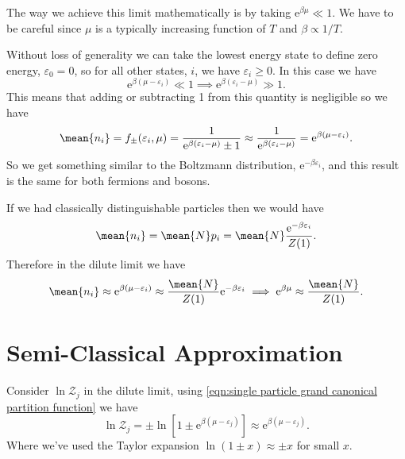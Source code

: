 \documentclass[fleqn]{NotesClass}
\newcommand*{\e}{\mathrm{e}}
\begin{document}
    The way we achieve this limit mathematically is by taking \(\e^{\beta\mu} \ll 1\).
    We have to be careful since \(\mu\) is a typically increasing function of \(T\) and \(\beta \propto 1/T\).
    
    Without loss of generality we can take the lowest energy state to define zero energy, \(\varepsilon_0 = 0\), so for all other states, \(i\), we have \(\varepsilon_i \ge 0\).
    In this case we have
    \begin{equation}
        \e^{\beta(\mu - \varepsilon_i)} \ll 1 \implies \e^{\beta(\varepsilon_i - \mu)} \gg 1.
    \end{equation}
    This means that adding or subtracting 1 from this quantity is negligible so we have
    \begin{equation}
        \mean{n_i} = f_{\pm}(\varepsilon_i, \mu) = \frac{1}{\e^{\beta(\varepsilon_i - \mu)} \pm 1} \approx \frac{1}{\e^{\beta(\varepsilon_i - \mu)}} = \e^{\beta(\mu - \varepsilon_i)}.
    \end{equation}
    So we get something similar to the Boltzmann distribution, \(\e^{-\beta\varepsilon_i}\), and this result is the same for both fermions and bosons.
    
    If we had classically distinguishable particles then we would have
    \begin{equation}
        \mean{n_i} = \mean{N} p_i = \mean{N}\frac{\e^{-\beta\varepsilon_i}}{Z(1)}.
    \end{equation}
    Therefore in the dilute limit we have
    \begin{equation}
        \mean{n_i} \approx \e^{\beta(\mu - \varepsilon_i)} \approx \frac{\mean{N}}{Z(1)}\e^{-\beta\varepsilon_i} \implies \e^{\beta\mu} \approx \frac{\mean{N}}{Z(1)}.
    \end{equation}
    
    \section{Semi-Classical Approximation}
    Consider \(\ln\mathcal{Z}_j\) in the dilute limit, using \cref{eqn:single particle grand canonical partition function} we have
    \begin{equation}
        \ln\mathcal{Z}_j = \pm \ln[1 \pm \e^{\beta(\mu - \varepsilon_j)}] \approx \e^{\beta(\mu - \varepsilon_j)}.
    \end{equation}
    Where we've used the Taylor expansion \(\ln(1 \pm x) \approx \pm x\) for small \(x\).
    
\end{document}
